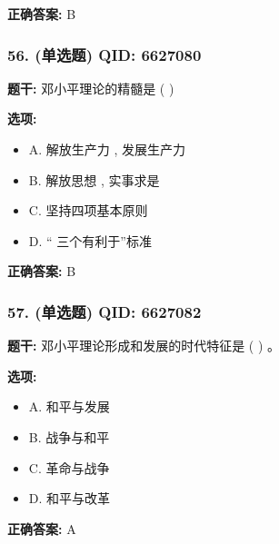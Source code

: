 \documentclass[12pt,UTF8]{ctexart}
\begin{document}
\textbf{正确答案:}
B

\vspace{0.3em}\hrulefill\vspace{0.7em}

\subsubsection*{56. (单选题) \small QID: 6627080}

\textbf{题干:}
邓小平理论的精髓是  ( )

\textbf{选项:}
\begin{itemize}[leftmargin=*]

  \item A. 解放生产力 , 发展生产力

  \item B. 解放思想 , 实事求是

  \item C. 坚持四项基本原则

  \item D. “ 三个有利于”标准

\end{itemize}

\textbf{正确答案:}
B

\vspace{0.3em}\hrulefill\vspace{0.7em}

\subsubsection*{57. (单选题) \small QID: 6627082}

\textbf{题干:}
邓小平理论形成和发展的时代特征是  ( )  。

\textbf{选项:}
\begin{itemize}[leftmargin=*]

  \item A. 和平与发展

  \item B. 战争与和平

  \item C. 革命与战争

  \item D. 和平与改革

\end{itemize}

\textbf{正确答案:}
A

\vspace{0.3em}\hrulefill\vspace{0.7em}
\end{document}
